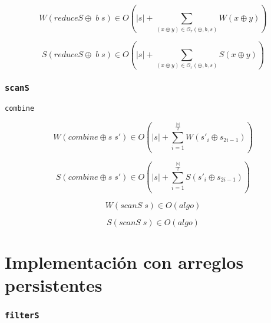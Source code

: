 \documentclass[a4paper,10pt]{article}
\begin{document}
\begin{equation*}
    W \left( reduceS \oplus \; b \; s \right) \in
    O \left( \vert s \vert + \sum_{(x \oplus y) \in \mathcal{O}_r(\oplus,b,s)} W \left( x \oplus y \right) \right)
\end{equation*}

\begin{equation*}
    S \left( reduceS \oplus \; b \; s \right) \in
    O \left( \vert s \vert + \sum_{(x \oplus y) \in \mathcal{O}_r(\oplus,b,s)} S \left( x \oplus y \right) \right)
\end{equation*}

\section*{\texttt{scanS}}

\texttt{combine}

\begin{equation*}
    W \left( combine \oplus s \; s' \right) \in
    O \left( \vert s \vert + \sum_{i=1}^{\frac{\vert s \vert}{2}} W \left( s'_{i} \oplus s_{2i - 1} \right) \right)
\end{equation*}

\begin{equation*}
    S \left( combine \oplus s \; s' \right) \in
    O \left( \vert s \vert + \sum_{i=1}^{\frac{\vert s \vert}{2}} S \left( s'_{i} \oplus s_{2i - 1} \right) \right)
\end{equation*}

\begin{equation*}
    W \left( scanS \; s \right) \in
    O \left( algo \right)
\end{equation*}

\begin{equation*}
    S \left( scanS \; s \right) \in O \left( algo \right)
\end{equation*}

\newpage{}

%
%
%
%
%
%
%
%
%
%
%
%
%
%
%
%
%
%
%
%
%
%
%
%
%
%
%
%
%
%
%
%
%
%
%
%
%
%
%
%
%

\part*{Implementación con arreglos persistentes}

\section*{\texttt{filterS}}
\end{document}
